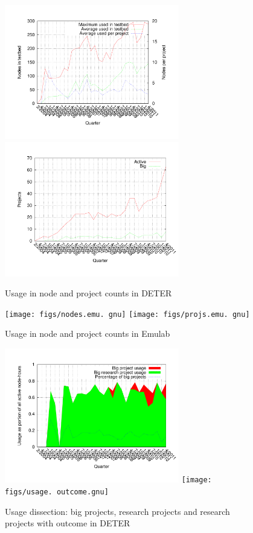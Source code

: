 \documentclass[10pt, twocolumn]{article} %
\begin{document}
\begin{figure}[htbp] \begin{center}
\includegraphics[width=3in,type=pdf,ext=.pdf,read=.pdf]{figs/nodes.gnu}
\includegraphics[width=3in,type=pdf,ext=.pdf,read=.pdf]{figs/projs.gnu}
\caption{Usage in node and project counts in DETER} \label{usagenp}
\end{center} \end{figure}

\begin{figure}[htbp] \begin{center}
\texttt{[image: figs/nodes.emu.
gnu]}
\texttt{[image: figs/projs.emu.
gnu]} \caption{Usage in node and project counts in Emulab}
\label{usagenpe} \end{center} \end{figure}

\begin{figure}[htbp] \begin{center}
\includegraphics[width=3in,type=pdf,ext=.pdf,read=.pdf]{figs/usage.gnu}
\texttt{[image: figs/usage.
outcome.gnu]} \caption{Usage dissection: big projects, research projects
and research projects with outcome in DETER} \label{usagedis}
\end{center} \end{figure}
\end{document}
